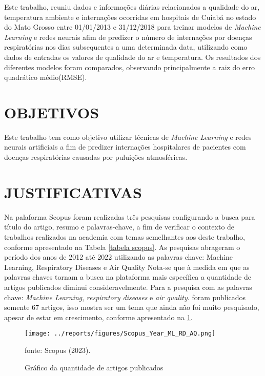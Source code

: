 \documentclass[
  12pt,		%
  a4paper,	%
  openright,%
  oneside,	%
  chapter=TITLE,		%
  section=TITLE,		%
  english,	%
  french,	%
  spanish,	%
  brazil	%
]{abntex2}
\begin{document}
    Este trabalho, reuniu dados e informações diárias relacionados a qualidade do ar, temperatura ambiente e internações ocorridas em hospitais
    de Cuiabá no estado do Mato Grosso entre 01/01/2013 e 31/12/2018 para treinar modelos de \textit{Machine Learning} e redes neurais afim de predizer
    o número de internações por doenças respiratórias nos dias subsequentes a uma determinada data, utilizando como dados de entradas os valores de qualidade do ar
    e temperatura. Os resultados dos diferentes modelos foram comparados, observando principalmente a raiz do erro quadrático médio(RMSE).
    
    \section{OBJETIVOS}
    Este trabalho tem como objetivo utilizar técnicas de \textit{Machine Learning} e redes neurais artificiais a fim de predizer 
    internações hospitalares de pacientes com doenças respiratórias
    causadas por puluições atmosféricas.
    \section{JUSTIFICATIVAS}
    Na palaforma Scopus foram realizadas três pesquisas configurando a busca para título do artigo, resumo e palavras-chave, a fim de verificar o contexto de trabalhos
    realizados na academia com temas semelhantes aos deste trabalho, conforme apresentado na Tabela \ref*{tabela scopus}. As pesquisas abrageram o período dos anos
    de 2012 até 2022 utilizando as palavras chave: Machine Learning, Respiratory Diseases e Air Quality
    Nota-se que à medida em que as palavras chaves tornam a busca na plataforma mais específica a quantidade de artigos publicados diminui consideravelmente.
    Para a pesquisa com as palavras chave: \textit{Machine Learning}, \textit{respiratory diseases} e \textit{air quality}.
    foram publicados somente 67 artigos, isso mostra ser um tema que ainda não foi muito pesquisado, apesar de estar em crescimento,
    conforme apresentado na \ref*{scopus_year}.

    \begin{figure}[ht]
        \centering
        \caption{Gráfico da quantidade de artigos publicados}
        \texttt{[image: ../reports/figures/Scopus\_Year\_ML\_RD\_AQ.png]}
        \label{scopus_year}
        \par
        {\small fonte: Scopus (2023).}
    \end{figure}
\end{document}
